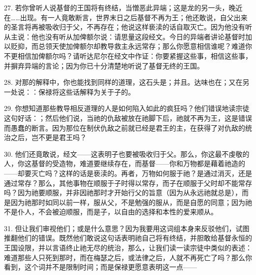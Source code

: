 27. 若你曾听人说基督的王国将有终结，当憎恶此异端；这是龙的另一头，晚近在……出现。有一人竟敢断言，世界末日之后基督不再为王；他还敢说，自父出来的圣言将再被吸收归于父，不再存在；他说这样亵渎的话自取灭亡。因为他没有听从主说：他也没有听从加俾额尔说：请思量这段经文。今日的异端者讲论基督时加以贬抑，而总领天使加俾额尔却教导救主永远常存；那么你愿意相信谁呢？难道你不更相信加俾额尔吗？请听达尼尔在经文中作证：你要紧握这些事，相信这些事，并摒弃异端的言论；因为你已十分清楚地听说了基督无终的王国。\par

28. 对那的解释中，你也能找到同样的道理，这石头是；并且。达味也在；又在另一处说：：保禄将这些话解释为关于子的。\par

29. 你想知道那些教导相反道理的人是如何陷入如此的疯狂吗？他们错误地读宗徒这句好话：；然后他们说，当祂的仇敌被放在祂脚下后，祂就不再为王，这是错误而愚蠢的断言。因为那位在制伏仇敌之前就已经是君王的主，在获得了对仇敌的统治之后，岂不更是君王吗？\par

30. 他们还竟敢说，经文——这表明子也要被吸收归于父。那么，你这最不虔敬的人，你这基督的受造物，难道要继续存在，而基督——你和万物都是藉着祂造的——却要灭亡吗？这样的话是亵渎的。再者，万物如何服于祂？是通过消灭，还是通过常存？那么，其他事物在顺服于子时得以常存，而子在顺服于父时却不能常存吗？因为祂要顺服，并非因祂那时才开始行父的旨意（因为从永远祂就总是），而是因为祂那时如同以前一样，服从父，不是勉强的服从，而是自愿的同意；因为祂不是仆人，不会被迫顺服，而是子，以自由的选择和本性的爱来顺从。\par

31. 但让我们审视他们；或是什么意思？因为我要用这词组本身来反驳他们，试图推翻他们的错误。既然他们敢说这句话表明祂自己将有终结，并胆敢给基督永恒的王国设限，并以言语终止祂无尽的统治，那么，让我们读一读宗徒中类似的表述：难道那些人只死到那时，而在梅瑟之后，或法律之后，人就不再死亡了吗？那么你看到，这个词并不是限制时间；而是保禄更愿意表明这一点——\par

